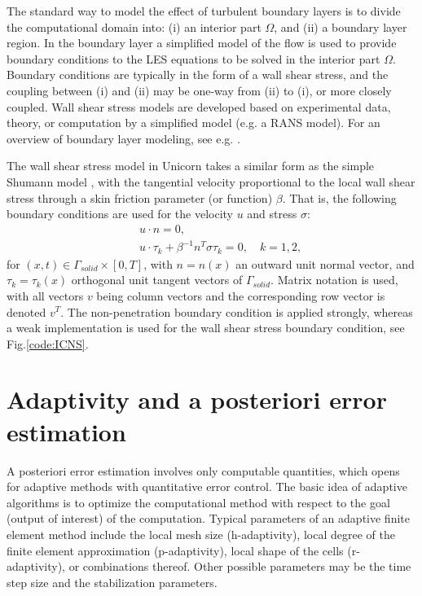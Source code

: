 The standard way to model the effect of turbulent boundary layers is to divide the computational domain into: (i) an interior part $\Omega$, and (ii) a boundary layer region. In the boundary layer a simplified model of the flow is used to provide boundary conditions to the LES equations to be solved in the interior part $\Omega$. Boundary conditions are typically in the form of a wall shear stress, and the coupling between (i) and (ii) may be one-way from (ii) to (i), or more closely coupled. Wall shear stress models are developed based on experimental data, theory, or computation by a simplified model (e.g. a RANS model). For an overview of boundary layer modeling, see e.g. \cite{SagautDeckTerracol2006,PiomelliBalaras2002}. 

The wall shear stress model in Unicorn takes a similar form as the simple Shumann model \cite{Schumann1975}, with the tangential velocity proportional to the local wall shear stress through a skin friction parameter (or function) $\beta$. That is, the following boundary conditions are used for the velocity $u$ and stress $\sigma$:
\begin{eqnarray} 
&&u\cdot n=0, \label{slfra} \\
&&u\cdot \tau _k + \beta ^{-1}n^T\sigma \tau _k=0,\quad k=1,2, \label{slfrb}
\end{eqnarray} 
for  $(x,t)\in \Gamma_{solid}\times [0,T]$, with $n=n(x)$ an outward unit normal vector, and $\tau_k=\tau_k(x)$ orthogonal unit tangent vectors of $\Gamma_{solid}$. Matrix notation is used, with all vectors $v$ being column vectors and the corresponding row vector is denoted $v^T$. The non-penetration boundary condition is applied strongly, whereas a weak implementation is used for the wall shear stress boundary condition, see Fig.\ref{code:ICNS}. 

\section{Adaptivity and a posteriori error estimation}

A posteriori error estimation involves only computable quantities, which opens for adaptive methods with quantitative error control. The basic idea of adaptive algorithms is to optimize the computational method with respect to the goal (output of interest) of the computation. Typical parameters of an adaptive finite element method include the local mesh size (h-adaptivity), local degree of the finite element approximation (p-adaptivity), local shape of the cells (r-adaptivity), or combinations thereof. Other possible parameters may be the time step size and the stabilization parameters. 

